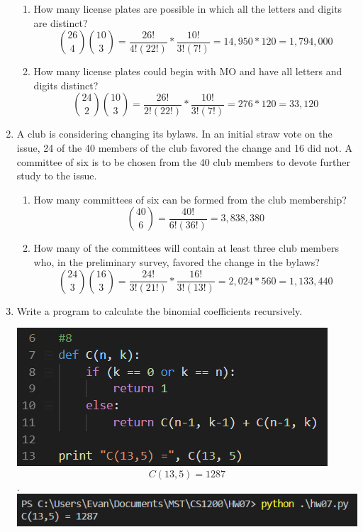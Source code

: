 \documentclass{article}
\begin{document}
\begin{enumerate}
\begin{enumerate}
        \item How many license plates are possible in which all the letters and digits are distinct?
        $${26 \choose 4}{10 \choose 3} = \frac{26!}{4!(22!)} * \frac{10!}{3!(7!)} = 14,950*120 = 1,794,000$$

        \item How many license plates could begin with MO and have all letters and digits distinct?
        $${24 \choose 2}{10 \choose 3} = \frac{26!}{2!(22!)} * \frac{10!}{3!(7!)} = 276*120 = 33,120$$

    \end{enumerate}
    
    \newpage
    \item A club is considering changing its bylaws. In an initial straw vote on the issue, 24
    of the 40 members of the club favored the change and 16 did not. A committee of six is
    to be chosen from the 40 club members to devote further study to the issue.

    \begin{enumerate}
        \item  How many committees of six can be formed from the club membership?
        $${40 \choose 6} = \frac{40!}{6!(36!)} = 3,838,380$$
        
        \item  How many of the committees will contain at least three club members who, in the
        preliminary survey, favored the change in the bylaws?
        $${24 \choose 3}{16 \choose 3} = \frac{24!}{3!(21!)} * \frac{16!}{3!(13!)} = 2,024*560=1,133,440$$
    
    \end{enumerate}
   
    \vspace{3cm}
    \item Write a program to calculate the binomial coefficients recursively.
    \begin{center}
        \includegraphics[scale=0.75]{8a}\\
        $$C(13, 5) = 1287$$.\\
        \includegraphics[scale=0.75]{8b}\\
    \end{center}

\end{enumerate}
\end{document}
